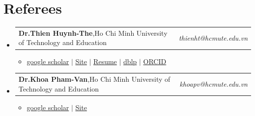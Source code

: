 \documentclass[a4paper,11pt]{article}
\makeatletter
\newcommand{\resumePOR}[3]{
\vspace{0.5mm}\item
    \begin{tabular*}{0.97\textwidth}[t]{l@{\extracolsep{\fill}}r}
        \textbf{#1},\hspace{0.3mm}#2 & \textit{\small{#3}} 
    \end{tabular*}
    \vspace{-2mm}
}
\newcommand{\resumeSubHeadingListStart}{\begin{itemize}[leftmargin=*,labelsep=0mm]}
\newcommand{\resumeItemListStart}{\begin{justify}\begin{itemize}[leftmargin=3ex, rightmargin=2ex, noitemsep,labelsep=1.2mm,itemsep=0mm]\small}
\newcommand{\resumeSubHeadingListEnd}{\end{itemize}\vspace{4mm}}
\newcommand{\resumeItemListEnd}{\end{itemize}\end{justify}\vspace{-2mm}}
\makeatother
\begin{document}
\section{Referees}
\vspace{-0.6mm}
\resumeSubHeadingListStart
\resumePOR{Dr.Thien Huynh-The} %
    {Ho Chi Minh University of Technology and Education} %
    {thienht@hcmute.edu.vn}
    \resumeItemListStart
      \item {\href{https://scholar.google.com/citations?user=_MLGtqEAAAAJ&;fbclid=IwAR08QAZBO_b35fdm1bM8v0fHEfl3-qivwMlnEFMarkt81gryNO2xrK8cubM}{google scholar}
          $|$ \href{https://sites.google.com/site/thienhuynhthe/home}{Site}
          $|$ \href{https://drive.google.com/file/d/1bVDb_Pw2yzkDWXj63IQiVxTfyNXbOE96/view}{Resume}
          $|$ \href{https://dblp.uni-trier.de/pid/153/6644.html}{dblp}
          $|$ \href{https://orcid.org/0000-0002-9172-2935}{ORCID} }
    \resumeItemListEnd
\resumePOR{Dr.Khoa Pham-Van}
    {Ho Chi Minh University of Technology and Education}
    {khoapv@hcmute.edu.vn}
    \resumeItemListStart
    \item
    {\href{https://scholar.google.co.kr/citations?user=t_abZ6kAAAAJ&;hl=en}{google scholar}
      $|$ \href{https://sites.google.com/site/khoaphamhcmute/}{Site} }
    \resumeItemListEnd
\resumeSubHeadingListEnd
\vspace{-6mm}

\end{document}

